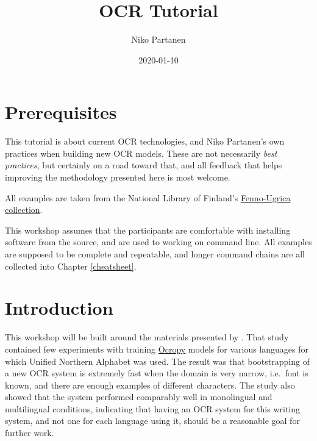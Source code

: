 \documentclass[]{book}
\title{OCR Tutorial}
\author{Niko Partanen}
\date{2020-01-10}
\begin{document}
\maketitle

{
\setcounter{tocdepth}{1}
\tableofcontents
}
\hypertarget{prerequisites}{%
\chapter{Prerequisites}\label{prerequisites}}

This tutorial is about current OCR technologies, and Niko Partanen's own practices when building new OCR models. These are not necessarily \emph{best practices}, but certainly on a road toward that, and all feedback that helps improving the methodology presented here is most welcome.

All examples are taken from the National Library of Finland's \href{https://fennougrica.kansalliskirjasto.fi/}{Fenno-Ugrica collection}.

This workshop assumes that the participants are comfortable with installing software from the source, and are used to working on command line. All examples are supposed to be complete and repeatable, and longer command chains are all collected into Chapter \ref{cheatsheet}.

\hypertarget{intro}{%
\chapter{Introduction}\label{intro}}

This workshop will be built around the materials presented by \citet{partanen2019ocr}. That study contained few experiments with training \href{https://github.com/tmbdev/ocropy}{Ocropy} models for various languages for which Unified Northern Alphabet was used. The result was that bootstrapping of a new OCR system is extremely fast when the domain is very narrow, i.e.~font is known, and there are enough examples of different characters. The study also showed that the system performed comparably well in monolingual and multilingual conditions, indicating that having an OCR system for this writing system, and not one for each language using it, should be a reasonable goal for further work.
\end{document}
